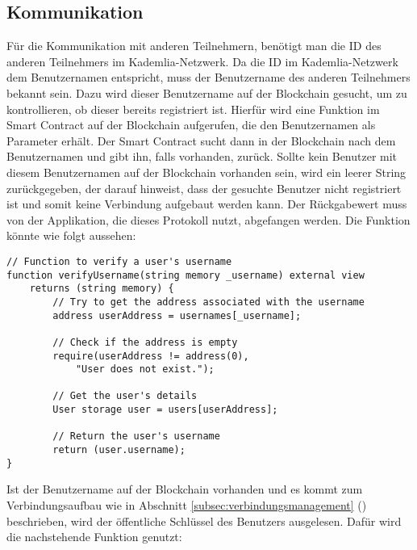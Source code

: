 \subsection{Kommunikation}
\label{subsec:contract_kommunikation}
Für die Kommunikation mit anderen Teilnehmern, benötigt man die ID des anderen Teilnehmers im Kademlia-Netzwerk. Da die ID im Kademlia-Netzwerk dem Benutzernamen entspricht, muss der Benutzername des anderen Teilnehmers bekannt sein. Dazu wird dieser Benutzername auf der Blockchain gesucht, um zu kontrollieren, ob dieser bereits registriert ist. Hierfür wird eine Funktion im Smart Contract auf der Blockchain aufgerufen, die den Benutzernamen als Parameter erhält. Der Smart Contract sucht dann in der Blockchain nach dem Benutzernamen und gibt ihn, falls vorhanden, zurück. Sollte kein Benutzer mit diesem Benutzernamen auf der Blockchain vorhanden sein, wird ein leerer String zurückgegeben, der darauf hinweist, dass der gesuchte Benutzer nicht registriert ist und somit keine Verbindung aufgebaut werden kann. Der Rückgabewert muss von der Applikation, die dieses Protokoll nutzt, abgefangen werden. 
Die Funktion könnte wie folgt aussehen:

\begin{lstlisting}[language=Solidity, caption={Suche nach einem Benutzernamen auf der Blockchain},captionpos=b]
// Function to verify a user's username
function verifyUsername(string memory _username) external view 
    returns (string memory) {
        // Try to get the address associated with the username
        address userAddress = usernames[_username];

        // Check if the address is empty
        require(userAddress != address(0), 
            "User does not exist.");

        // Get the user's details
        User storage user = users[userAddress];

        // Return the user's username
        return (user.username);
}
\end{lstlisting}


\noindent Ist der Benutzername auf der Blockchain vorhanden und es kommt zum Verbindungsaufbau wie in Abschnitt \ref{subsec:verbindungsmanagement} () beschrieben, wird der öffentliche Schlüssel des Benutzers ausgelesen. Dafür wird die nachstehende Funktion genutzt:

